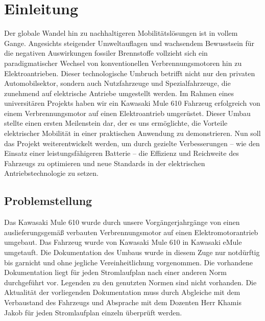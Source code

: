 \chapter{Einleitung}
\label{cha:Problemstellung, Ziel und Vorgehensweise der Arbeit}

Der globale Wandel hin zu nachhaltigeren Mobilitätslösungen ist in vollem Gange. Angesichts steigender Umweltauflagen und wachsendem Bewusstsein für die negativen Auswirkungen fossiler Brennstoffe vollzieht sich ein paradigmatischer Wechsel von konventionellen Verbrennungsmotoren hin zu Elektroantrieben. Dieser technologische Umbruch betrifft nicht nur den privaten Automobilsektor, sondern auch Nutzfahrzeuge und Spezialfahrzeuge, die zunehmend auf elektrische Antriebe umgestellt werden. \autocite{Pischinger2023}
Im Rahmen eines universitären Projekts haben wir ein Kawasaki Mule 610 Fahrzeug erfolgreich von einem Verbrennungsmotor auf einen Elektroantrieb umgerüstet. Dieser Umbau stellte einen ersten Meilenstein dar, der es uns ermöglichte, die Vorteile elektrischer Mobilität in einer praktischen Anwendung zu demonstrieren. Nun soll das Projekt weiterentwickelt werden, um durch gezielte Verbesserungen – wie den Einsatz einer leistungsfähigeren Batterie – die Effizienz und Reichweite des Fahrzeugs zu optimieren und neue Standards in der elektrischen Antriebstechnologie zu setzen.
\clearpage
\section*{Problemstellung}
Das Kawasaki Mule 610 wurde durch unsere Vorgängerjahrgänge von einen auslieferungsgemäß verbauten Verbrennungsmotor auf einen Elektromotorantrieb umgebaut. Das Fahrzeug wurde von \glqq Kawasaki Mule 610\grqq{} in \glqq Kawasaki eMule\grqq{} umgetauft. Die Dokumentation des Umbaus wurde in diesem Zuge nur notdürftig bis garnicht und ohne jegliche Vereinheitlichung vorgenommen. Die vorhandene Dokumentation liegt für jeden Stromlaufplan nach einer anderen Norm durchgeführt vor. Legenden zu den genutzten Normen sind nicht vorhanden. Die Aktualität der vorliegenden Dokumentation muss durch Abgleiche mit dem Verbaustand des Fahrzeugs und Absprache mit dem Dozenten Herr Khamis Jakob für jeden Stromlaufplan einzeln überprüft werden.  


